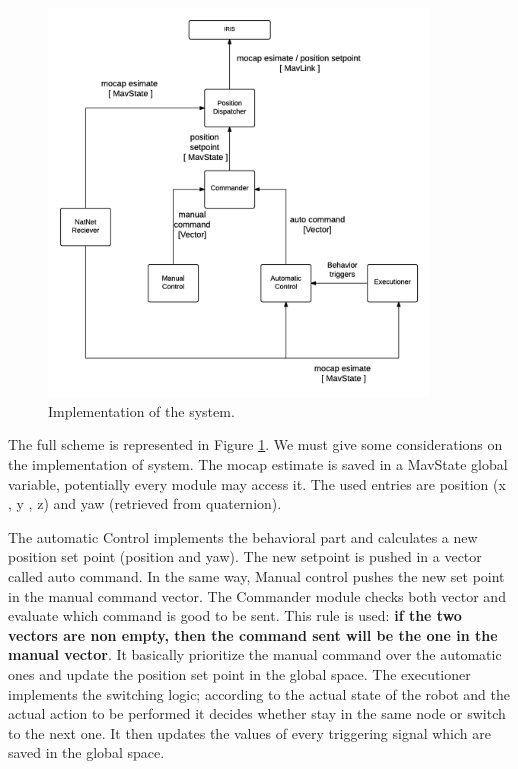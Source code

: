 \begin{figure}[h]
\centering
 \includegraphics[width=0.9\textwidth]{arch_scheme.png}
 \caption[Achtitecture scheme]{Implementation of the system.}
 \label{figure:archscheme}
\end{figure}
\noindent
The full scheme is represented in Figure \ref{figure:archscheme}. We must give some considerations on the implementation of system. The mocap estimate is saved in a MavState global variable, potentially every module may access it. The used entries are position (x , y , z) and yaw (retrieved from quaternion).

The automatic Control implements the behavioral part and calculates a new position set point (position and yaw). The new setpoint is pushed in a vector called auto command. In the same way, Manual control pushes the new set point in the manual command vector. The Commander module checks both vector and evaluate which command is good to be sent. This rule is used: \textbf{if the two vectors are non empty, then the command sent will be the one in the manual vector}. It basically prioritize the manual command over the automatic ones and update the position set point in the global space. The executioner implements the switching logic; according to the actual state of the robot and the actual action to be performed it decides whether stay in the same node or switch to the next one. It then updates the values of every triggering signal which are saved in the global space.

